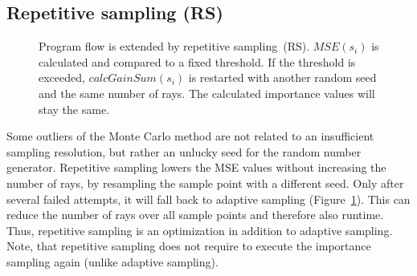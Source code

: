 \subsection{Repetitive sampling (RS)}
\begin{figure}[H]
  \centerline
      {}
  \caption{Program flow is extended by repetitive sampling~(RS).
    $MSE(s_i)$ is calculated and compared to a fixed threshold. If the
    threshold is exceeded, $calcGainSum(s_i)$ is restarted with
    another random seed and the same number of rays. The calculated
    importance values will stay the same.}
  \label{graphic:pap4}
\end{figure}
Some outliers of the Monte Carlo method are not related to an
insufficient sampling resolution, but rather an unlucky seed for the
random number generator.  Repetitive sampling lowers the MSE values
without increasing the number of rays, by resampling the sample point
with a different seed. Only after several failed attempts, it will
fall back to adaptive sampling (Figure~\ref{graphic:pap4}). This can
reduce the number of rays over all sample points and therefore also
runtime. Thus, repetitive sampling is an optimization in addition to
adaptive sampling.  Note, that repetitive sampling does not require to
execute the importance sampling again (unlike adaptive sampling).

